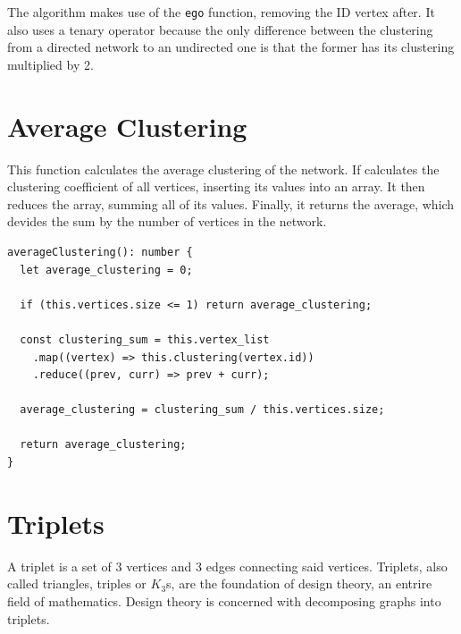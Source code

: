 The algorithm makes use of the \texttt{ego} function, removing the ID vertex after.
It also uses a tenary operator because the only difference between the clustering
from a directed network to an undirected one is
that the former has its clustering multiplied by 2.

\section{Average Clustering}

This function calculates the average clustering of the network.
If calculates the clustering coefficient of all vertices, inserting its values into an array.
It then reduces the array, summing all of its values.
Finally, it returns the average, which devides the sum by the number of vertices in the network.
\begin{verbatim}
averageClustering(): number {
  let average_clustering = 0;

  if (this.vertices.size <= 1) return average_clustering;

  const clustering_sum = this.vertex_list
    .map((vertex) => this.clustering(vertex.id))
    .reduce((prev, curr) => prev + curr);

  average_clustering = clustering_sum / this.vertices.size;

  return average_clustering;
}
\end{verbatim}

\section{Triplets}

A triplet is a set of 3 vertices and 3 edges connecting said vertices.
Triplets, also called triangles, triples or $K_3$s,
are the foundation of design theory,
an entrire field of mathematics.
Design theory is concerned with decomposing graphs into triplets.

